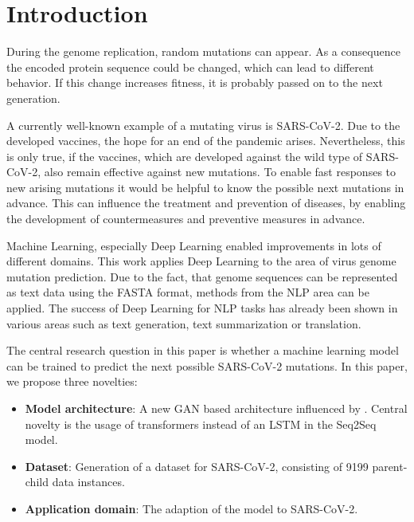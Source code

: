 \section{Introduction} \label{introduction}

During the genome replication, random mutations can appear. As a con\-se\-quence the encoded protein sequence could be changed, which can lead to different behavior. If this change increases fitness, it is probably passed on to the next generation. \cite{Berman2020}

A currently well-known example of a mutating virus is \ac{SARS-CoV-2}. Due to the developed vaccines, the hope for an end of the pandemic arises. Nevertheless, this is only true, if the vaccines, which are developed against the wild type of \ac{SARS-CoV-2}, also remain effective against new mutations. To enable fast responses to new arising mutations it would be helpful to know the possible next mutations in advance. This can influence the treatment and prevention of diseases, by enabling the development of countermeasures and preventive measures in advance. \cite{Berman2020}

Machine Learning, especially Deep Learning enabled improvements in lots of different domains. This work applies Deep Learning to the area of virus genome mutation prediction. Due to the fact, that genome sequences can be represented as text data using the FASTA format, methods from the \ac{NLP} area can be applied. The success of Deep Learning for \ac{NLP} tasks has already been shown in various areas such as text generation, text sum\-ma\-riza\-t\-ion or translation. \cite{Berman2020}

The central research question in this paper is whether a machine learning model can be trained to predict the next possible \ac{SARS-CoV-2} mutations. In this paper, we propose three novelties:

\begin{itemize}
	\item \textbf{Model architecture}: A new \ac{GAN} based architecture influenced by \cite{Berman2020}. Central novelty is the usage of trans\-for\-mers instead of an \ac{LSTM} in the \ac{Seq2Seq} model.
	\item \textbf{Dataset}: Generation of a dataset for \ac{SARS-CoV-2}, consisting of 9199 parent-child data instances. 
	\item \textbf{Application domain}: The adaption of the model to \ac{SARS-CoV-2}.
\end{itemize}

\newpage
